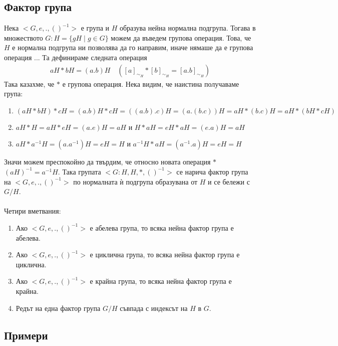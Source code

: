 \documentclass[12pt]{article}
\begin{document}
\subsection{Фактор група}
Нека \(<G, e, . , ()^{-1}>\) е група и \(H\) образува нейна нормална подгрупа.
Тогава в множеството \(G : H = \{gH \; | \; g \in G\}\) можем да въведем групова операция.
Това, че \(H\) е нормална подгрупа ни позволява да го направим, иначе нямаше да е групова операция ... Та дефинираме следната операция
\begin{align*}
    aH * bH = (a.b)H \quad ([a]_{\sim_H} * [b]_{\sim_H} = [a.b]_{\sim_H})
\end{align*}
Така казахме, че \(*\) е групова операция.
Нека видим, че наистина получаваме група:
\begin{enumerate}
    \item \((aH * bH) * cH = (a.b)H * cH = ((a.b).c)H = (a.(b.c))H = aH * (b.c)H = aH * (bH * cH)\)
    \item \(aH * H = aH * eH = (a.e)H = aH\) и \(H * aH = eH * aH = (e.a)H = aH\)
    \item \(aH * a^{-1}H = (a.a^{-1})H = eH = H\) и \(a^{-1}H * aH = (a^{-1}.a)H = eH = H\)
\end{enumerate}
Значи можем преспокойно да твърдим, че относно новата операция \(*\) \((aH)^{-1} = a^{-1}H\).
Така групата \(<G : H, H, *, ()^{-1}>\) се нарича фактор група на \(<G, e, . , ()^{-1}>\)
по нормалната ѝ подгрупа образувана от \(H\) и се бележи с \(G / H\).
\\
\vspace{2mm}
\\
Четири вметвания:
\begin{enumerate}
    \item Ако \(<G, e, . , ()^{-1}>\) е абелева група, то всяка нейна фактор група е абелева.
    \item Ако \(<G, e, . , ()^{-1}>\) е циклична група, то всяка нейна фактор група е циклична.
    \item Ако \(<G, e, . , ()^{-1}>\) е крайна група, то всяка нейна фактор група е крайна.
    \item Редът на една фактор група \(G / H\) съвпада с индексът на \(H\) в \(G\).
\end{enumerate}
\subsection{Примери}
\end{document}
